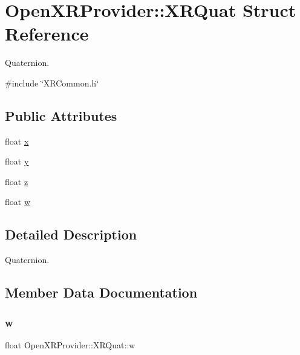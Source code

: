 \hypertarget{struct_open_x_r_provider_1_1_x_r_quat}{}\section{Open\+X\+R\+Provider\+::X\+R\+Quat Struct Reference}
\label{struct_open_x_r_provider_1_1_x_r_quat}


Quaternion.  




{\ttfamily \#include \char`\"{}X\+R\+Common.\+h\char`\"{}}

\subsection*{Public Attributes}
\begin{DoxyCompactItemize}
\item 
float \mbox{\hyperlink{struct_open_x_r_provider_1_1_x_r_quat_aa22fd6ef34f0accae34d5032f36057bd}{x}}
\item 
float \mbox{\hyperlink{struct_open_x_r_provider_1_1_x_r_quat_a0eb12175a81a55ff79d9774b15fb017e}{y}}
\item 
float \mbox{\hyperlink{struct_open_x_r_provider_1_1_x_r_quat_a961ae9851e876a9cf40279e37f815fe8}{z}}
\item 
float \mbox{\hyperlink{struct_open_x_r_provider_1_1_x_r_quat_a4f3ffb20480b2402d59bdc1941aa49a4}{w}}
\end{DoxyCompactItemize}


\subsection{Detailed Description}
Quaternion. 

\subsection{Member Data Documentation}
\mbox{\label{struct_open_x_r_provider_1_1_x_r_quat_a4f3ffb20480b2402d59bdc1941aa49a4}} 
\subsubsection{\texorpdfstring{w}{w}}
{\footnotesize\ttfamily float Open\+X\+R\+Provider\+::\+X\+R\+Quat\+::w}

